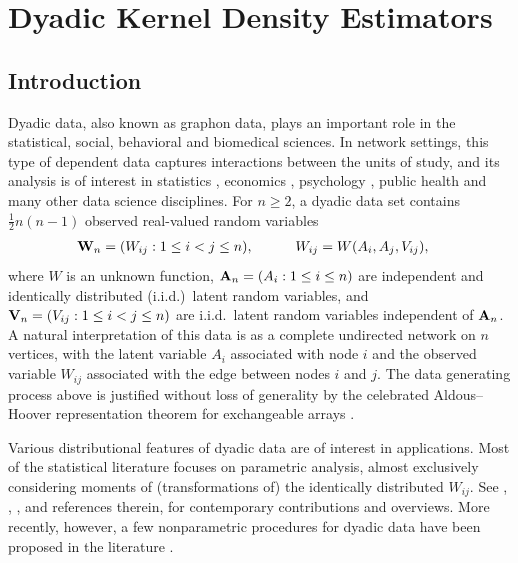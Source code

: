 
\chapter{Dyadic Kernel Density Estimators}
\label{cha:kernel}

\section{Introduction}
\label{sec:introduction}

Dyadic data, also known as graphon data,
plays an important role in the statistical, social,
behavioral and biomedical sciences.
In network settings,
this type of dependent data captures
interactions between the units of study,
and its analysis is
of interest in statistics \citep{kolaczyk2009statistical}, economics
\citep{graham2020network}, psychology \citep{kenny2020dyadic}, public health
\citep{luke2007network} and many other data science disciplines.
For $n \geq 2$, a dyadic data set contains
$\frac{1}{2}n(n-1)$
observed real-valued random variables
%
\begin{align*}
  \mathbf{W}_n = (W_{i j}:1\leq i<j \leq n),
  \quad\qquad W_{i j}
  &= W(A_i,A_j,V_{i j}),
\end{align*}
%
where $W$ is an unknown function, $\mathbf{A}_n=(A_{i}:1\leq i \leq n)$
are independent and identically distributed (i.i.d.)\ latent random variables,
and $\mathbf{V}_n=(V_{i j}:1\leq i<j \leq n)$ are i.i.d.\
latent random variables independent of $\mathbf{A}_n$.
A natural interpretation of
this data is as a complete
undirected network on $n$ vertices,
with the latent variable $A_i$ associated with node $i$
and the observed variable $W_{i j}$ associated
with the edge between nodes $i$ and $j$.
The data generating process above is justified
without loss of generality by the celebrated
Aldous--Hoover representation theorem
for exchangeable arrays
\citep{aldous1981representations, hoover1979relations}.

Various distributional features of dyadic data are of interest in applications.
Most of the statistical literature focuses on parametric analysis, almost
exclusively considering moments of (transformations of)
the identically distributed $W_{i j}$.
See \citet{davezies2021exchangeable}, \citet{gao2021minimax},
\citet{MatsushitaOtsu2021}, and references therein, for contemporary
contributions and overviews. More recently, however, a few nonparametric
procedures for dyadic data have been proposed in the literature
\citep{graham2021dyadicregression,graham2022kernel}.

